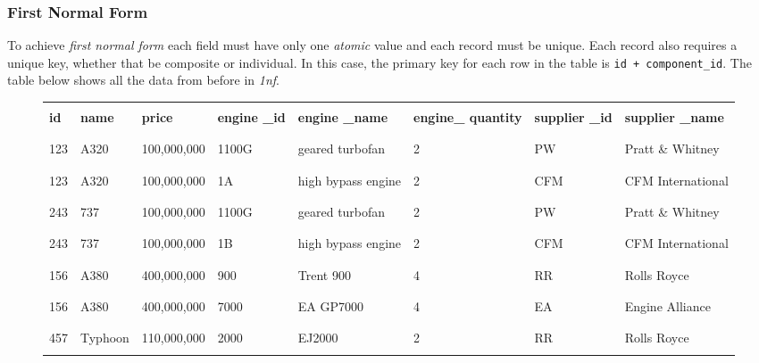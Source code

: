 \documentclass[10pt]{article}
\begin{document}
\subsubsection{First Normal Form}
\label{sec:org5567737}

To achieve \emph{first normal form} each field must have only one \emph{atomic} value and each record must be unique. Each record also requires a unique key, whether that be composite or individual. In this case, the primary key for each row in the table is \texttt{id + component\_id}. The table below shows all the data from before in \emph{1nf}.

\begin{figure}[H]
\begin{center}
\begin{longtable}{ |C{0.05\textwidth}|C{0.08\textwidth}|C{0.105\textwidth}|C{0.1\textwidth}|C{0.1\textwidth}|C{0.1\textwidth}|C{0.07\textwidth}|C{0.1\textwidth}| }
\hline
&&&&&&&\\
\textbf{id} & \textbf{name} & \textbf{price} & \textbf{engine \_id} & \textbf{engine \_name} & \textbf{engine\_ quantity} & \textbf{supplier \_id} & \textbf{supplier \_name}\\
&&&&&&&\\
\hline
&&&&&&&\\
123 & A320 & 100,000,000 & 1100G & geared turbofan & 2 & PW & Pratt \& Whitney\\
&&&&&&&\\
\hline
&&&&&&&\\
123 & A320 & 100,000,000 & 1A & high bypass engine & 2 & CFM & CFM International\\
&&&&&&&\\
\hline
&&&&&&&\\
243 & 737 & 100,000,000 & 1100G & geared turbofan & 2 & PW & Pratt \& Whitney\\
&&&&&&&\\
\hline
&&&&&&&\\
243 & 737 & 100,000,000 & 1B & high bypass engine & 2 & CFM & CFM International\\
&&&&&&&\\
\hline
&&&&&&&\\
156 & A380 & 400,000,000 & 900 & Trent 900 & 4 & RR & Rolls Royce\\
&&&&&&&\\
\hline
&&&&&&&\\
156 & A380 & 400,000,000 & 7000 & EA GP7000 & 4 & EA & Engine Alliance\\
&&&&&&&\\
\hline
&&&&&&&\\
457 & Typhoon & 110,000,000 & 2000 & EJ2000 & 2 & RR & Rolls Royce\\
&&&&&&&\\
\hline
\end{longtable}
\end{center}
\end{figure}
\end{document}
